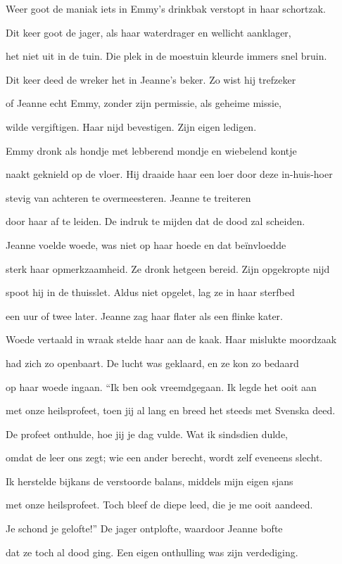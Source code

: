Weer goot de maniak
iets in Emmy’s drinkbak
verstopt in haar schortzak.

Dit keer goot de jager,
als haar waterdrager
en wellicht aanklager,

het niet uit in de tuin.
Die plek in de moestuin
kleurde immers snel bruin.

Dit keer deed de wreker
het in Jeanne’s beker.
Zo wist hij trefzeker

of Jeanne echt Emmy,
zonder zijn permissie,
als geheime missie,

wilde vergiftigen.
Haar nijd bevestigen.
Zijn eigen ledigen.

Emmy dronk als hondje
met lebberend mondje
en wiebelend kontje

naakt geknield op de vloer.
Hij draaide haar een loer
door deze in-huis-hoer

stevig van achteren
te overmeesteren.
Jeanne te treiteren

door haar af te leiden.
De indruk te mijden
dat de dood zal scheiden.

Jeanne voelde woede,
was niet op haar hoede
en dat beïnvloedde

sterk haar opmerkzaamheid.
Ze dronk hetgeen bereid.
Zijn opgekropte nijd

spoot hij in de thuisslet.
Aldus niet opgelet,
lag ze in haar sterfbed

een uur of twee later.
Jeanne zag haar flater
als een flinke kater.

Woede vertaald in wraak
stelde haar aan de kaak.
Haar mislukte moordzaak

had zich zo openbaart.
De lucht was geklaard,
en ze kon zo bedaard

op haar woede ingaan.
“Ik ben ook vreemdgegaan.
Ik legde het ooit aan

met onze heilsprofeet,
toen jij al lang en breed
het steeds met Svenska deed.

De profeet onthulde,
hoe jij je dag vulde.
Wat ik sindsdien dulde,

omdat de leer ons zegt;
wie een ander berecht,
wordt zelf eveneens slecht.

Ik herstelde bijkans
de verstoorde balans,
middels mijn eigen sjans

met onze heilsprofeet.
Toch bleef de diepe leed,
die je me ooit aandeed.

Je schond je gelofte!”
De jager ontplofte,
waardoor Jeanne bofte

dat ze toch al dood ging.
Een eigen onthulling
was zijn verdediging.

